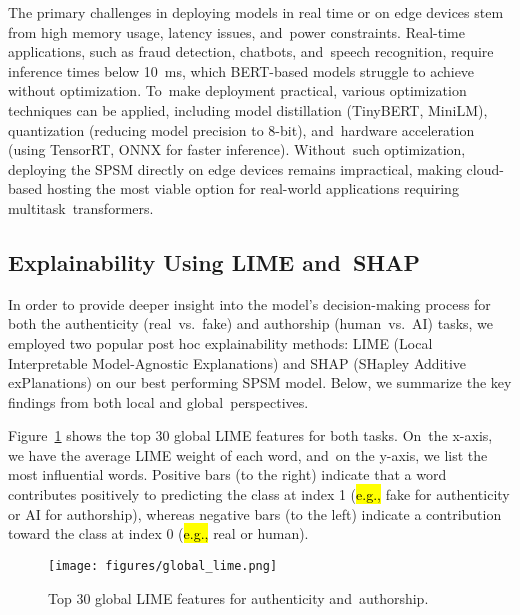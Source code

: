 \documentclass[electronics,article,accept,pdftex,moreauthors,electronics]{Definitions/mdpi}
\begin{document}
The primary challenges in deploying models in real time or on edge devices stem from high memory usage, latency issues, and~power constraints. Real-time applications, such as fraud detection, chatbots, and~speech recognition, require inference times below 10~ms, which BERT-based models struggle to achieve without optimization. To~make deployment practical, various optimization techniques can be applied, including model distillation (TinyBERT, MiniLM), quantization (reducing model precision to 8-bit), and~hardware acceleration (using TensorRT, ONNX for faster inference). Without~such optimization, deploying the SPSM directly on edge devices remains impractical, making cloud-based hosting the most viable option for real-world applications requiring multitask~transformers.


\subsection{Explainability Using LIME and~SHAP}
\label{subsec:explainability}

In order to provide deeper insight into the model's decision-making process for both the authenticity (real~vs.~fake) and authorship (human~vs.~AI) tasks, we employed two popular post hoc explainability methods: LIME (Local Interpretable Model-Agnostic Explanations) and SHAP (SHapley Additive exPlanations) on our best performing SPSM model. Below, we summarize the key findings from both local and global~perspectives.

Figure~\ref{fig:global-lime} shows the top 30 global LIME features for both tasks. On~the x-axis, we have the average LIME weight of each word, and~on the y-axis, we list the most influential words. Positive bars (to the right) indicate that a word contributes positively to predicting the class at index 1 (\hl{e.g.,} %
 fake for authenticity or AI for authorship), whereas negative bars (to the left) indicate a contribution toward the class at index 0 (\hl{e.g.,} real or human).  

\vspace{-4pt}
\begin{figure}[H] %
    \texttt{[image: figures/global\_lime.png]}\vspace{-4pt}
    \caption{Top 30 global LIME features for authenticity and~authorship.}
    \label{fig:global-lime}
\end{figure}
\end{document}
